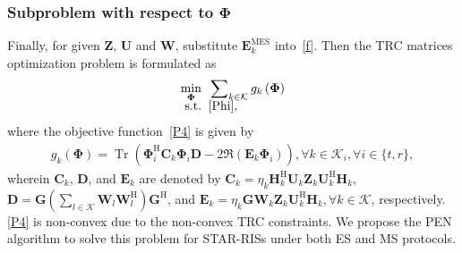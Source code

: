 \documentclass[12pt, draftclsnofoot, onecolumn]{IEEEtran}
\DeclareMathOperator{\tr}{Tr}
\begin{document}
\subsubsection{Subproblem with respect to $\mathbf{\Phi}$}
Finally, for given $\mathbf{Z}$, $\mathbf{U}$ and $\mathbf{W}$, substitute $\mathbf{E}_k^{\text{MES}}$ into~\eqref{f}. Then the TRC matrices optimization problem is formulated as
\begin{subequations}\label{P4}
\begin{align}
\mathop {\min }\limits_{ {{\mathbf{\Phi}}} } \;\;&\sum\nolimits_{k\in\mathcal{K}}{g}_k\left(\mathbf{\Phi}\right)\\[-0.2cm]
{\rm{s.t.}}\;\;& \eqref{Phi},
\end{align}
\end{subequations}
where the objective function~\eqref{P4} is given by
\begin{equation}
\begin{aligned}
{g}_k\left(\mathbf{\Phi}\right)=\tr\left(\mathbf{\Phi}_i^\mathrm{H}\mathbf{C}_k\mathbf{\Phi}_i\mathbf{D}-2\Re\left(\mathbf{E}_k\mathbf{\Phi}_i\right)\right), \forall k \in \mathcal{K}_i, \forall i \in \{t,r\},
\end{aligned}
\end{equation}
wherein $\mathbf{C}_k$, $\mathbf{D}$, and $\mathbf{E}_k$ are denoted by $\mathbf{C}_k=\eta_k\mathbf{H}_k^\mathrm{H}\mathbf{U}_k\mathbf{Z}_k\mathbf{U}_k^\mathrm{H}\mathbf{H}_k$, $\mathbf{D}=\mathbf{G}\left(\sum_{l\in\mathcal{K}}\mathbf{W}_l\mathbf{W}_l^\mathrm{H}\right)\mathbf{G}^\mathrm{H}$, and $\mathbf{E}_k=\eta_k\mathbf{G}\mathbf{W}_k\mathbf{Z}_k\mathbf{U}_k^\mathrm{H}{\mathbf{H}}_k, \forall k \in \mathcal{K}$, respectively. \eqref{P4} is non-convex due to the non-convex TRC constraints. We propose the PEN algorithm to solve this problem for STAR-RISs under both ES and MS protocols.
\end{document}
